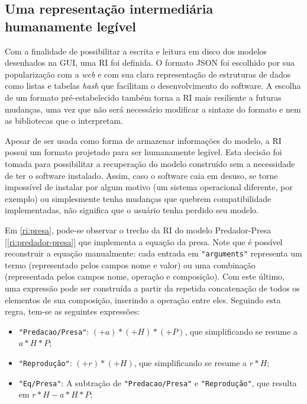 \documentclass[
	12pt,				%
	openright,			%
	oneside,			%
	a4paper,			%
	main=brazil,
	english,			%
	]{ufsj-abntex2}
\begin{document}
\subsection{Uma representação intermediária humanamente legível}
\label{subsection:RI}

Com a finalidade de possibilitar a escrita e leitura em disco dos modelos desenhados na GUI, uma RI foi definida. O formato JSON foi escolhido por sua popularização com a \textit{web} e com sua clara representação de estruturas de dados como listas e tabelas \textit{hash} que facilitam o desenvolvimento do software. A escolha de um formato pré-estabelecido também torna a RI mais resiliente a futuras mudanças, uma vez que não será necessário modificar a sintaxe do formato e nem as bibliotecas que o interpretam.

Apesar de ser usada como forma de armazenar informações do modelo, a RI possui um formato projetado para ser humanamente legível. Esta decisão foi tomada para possibilitar a recuperação do modelo construído sem a necessidade de ter o software instalado. Assim, caso o software caia em desuso, se torne impossível de instalar por algum motivo (um sistema operacional diferente, por exemplo) ou simplesmente tenha mudanças que quebrem compatibilidade implementadas, não significa que o usuário tenha perdido seu 
modelo.

Em \ref{ri:presa}, pode-se observar o trecho da RI do modelo Predador-Presa [\ref{ri:predador-presa}] que implementa a equação da presa. Note que é possível reconstruir a equação manualmente: cada entrada em \texttt{"arguments"} representa um termo (representado pelos campos nome e valor) ou uma combinação (representada pelos campos nome, operação e composição). Com este último, uma expressão pode ser construída a partir da repetida concatenação de todos os elementos de sua composição, inserindo a operação entre eles. Seguindo esta regra, tem-se as seguintes expressões:

\begin{itemize}
    \item \texttt{"Predacao/Presa"}: \((+a)*(+H)*(+P)\), que simplificando se resume a \(a*H*P\);
    \item \texttt{"Reprodução"}: \((+r)*(+H)\), que simplificando se resume a \(r*H\);
    \item \texttt{"Eq/Presa"}: A subtração de \texttt{"Predacao/Presa"} e \texttt{"Reprodução"}, que resulta em \(r*H-a*H*P\);
\end{itemize}
\end{document}
